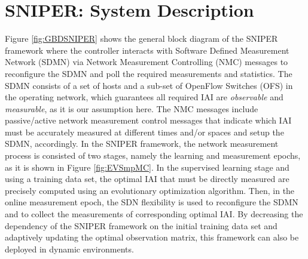 \section{SNIPER: System Description}  \label{sec:SNIPERSysDsc}
Figure \ref{fig:GBDSNIPER} shows the general block diagram of the SNIPER framework where the controller interacts with Software Defined Measurement Network (SDMN) via Network Measurement Controlling (NMC) messages to reconfigure the SDMN and poll the required measurements and statistics. The SDMN consists of a set of hosts and a sub-set of OpenFlow Switches (OFS) in the operating network, which guarantees all required IAI are \emph{observable} and \emph{measurable}, as it is our assumption here. The NMC messages include passive/active network measurement control messages that indicate which IAI must be accurately measured at different times and/or spaces and setup the SDMN, accordingly. In the SNIPER framework, the network measurement process is consisted of two stages, namely the learning and measurement epochs, as it is shown in Figure \ref{fig:EVSmpMC}. In the supervised learning stage and using a training data set, the optimal IAI that must be directly measured are precisely computed using an evolutionary optimization algorithm. Then, in the online measurement epoch, the SDN flexibility is used to reconfigure the SDMN and to collect the measurements of corresponding optimal IAI. By decreasing the dependency of the SNIPER framework on the initial training data set and adaptively updating the optimal observation matrix, this framework can also be deployed in dynamic environments.

